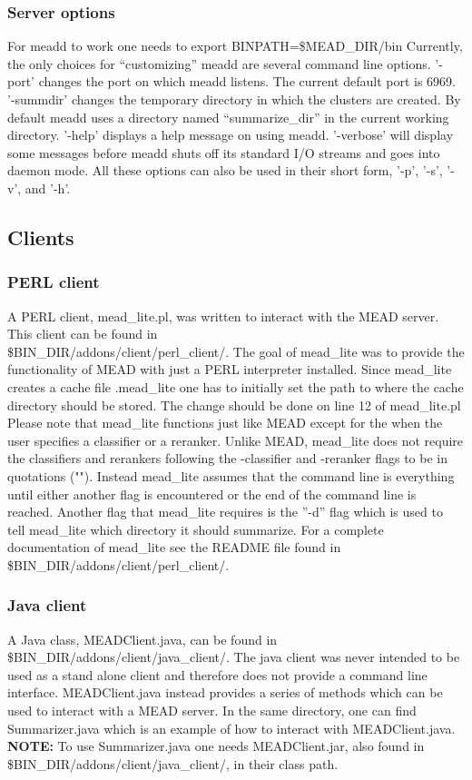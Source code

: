 \documentclass[10pt]{article}
\begin{document}
\subsubsection{Server options}
For meadd to work one needs to export BINPATH=\$MEAD\_DIR/bin
Currently, the only choices for ``customizing'' meadd are several
command line options.  '-port' changes the port on which meadd
listens.  The current default port is 6969. '-summdir' changes
the temporary directory in which the clusters are created.  By
default meadd uses a directory named ``summarize\_dir'' in the
current working directory.  '-help' displays a help message on
using meadd.  '-verbose' will display some messages before meadd
shuts off its standard I/O streams and goes into daemon mode.
All these options can also be used in their short form, '-p',
'-s', '-v', and '-h'.


\subsection{Clients}
\subsubsection{PERL client}
A PERL client, mead\_lite.pl, was written to interact with the MEAD
server.  This client can be found in\\
\$BIN\_DIR/addons/client/perl\_client/.  The goal of mead\_lite was to
provide the functionality of MEAD with just a PERL interpreter
installed.  Since mead\_lite creates a cache file .mead\_lite one has to initially set the path to where the cache directory should be stored.  The change should be done on line 12 of mead\_lite.pl
Please note that mead\_lite functions just like MEAD
except for the when the user specifies a classifier or a reranker.
Unlike MEAD, mead\_lite does not require the classifiers and rerankers
following the -classifier and -reranker flags to be in quotations
("").  Instead mead\_lite assumes that the command line is everything
until either another flag is encountered or the end of the command
line is reached.  Another flag that mead\_lite requires is the ''-d''
flag which is used to tell mead\_lite which directory it should
summarize.  For a complete documentation of mead\_lite see the README
file found in \$BIN\_DIR/addons/client/perl\_client/.


\subsubsection{Java client}
A Java class, MEADClient.java, can be found in \$BIN\_DIR/addons/client/java\_client/.
The java client was never intended to be used as a stand alone client and therefore does not provide a command line interface.
MEADClient.java instead provides a series of methods which can be used to interact with a MEAD server.
In the same directory, one can find Summarizer.java which is an example of how to interact with MEADClient.java.
{\bf NOTE:} To use Summarizer.java one needs MEADClient.jar, also found in  \$BIN\_DIR/addons/client/java\_client/, in their class path.  
\end{document}
